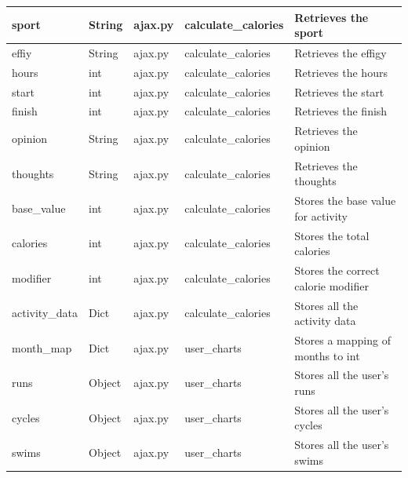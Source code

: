 \documentclass{article}[12pt,a4paper]
\begin{document}
\begin{table}[h]
\begin{tabular}{lllll}
sport             & String        & ajax.py             & calculate\_calories     & Retrieves the sport                     \\ \hline
effiy             & String        & ajax.py             & calculate\_calories     & Retrieves the effigy                    \\ \hline
hours             & int           & ajax.py             & calculate\_calories     & Retrieves the hours                     \\ \hline
start             & int           & ajax.py             & calculate\_calories     & Retrieves the start                     \\ \hline
finish            & int           & ajax.py             & calculate\_calories     & Retrieves the finish                    \\ \hline
opinion           & String        & ajax.py             & calculate\_calories     & Retrieves the opinion                   \\ \hline
thoughts          & String        & ajax.py             & calculate\_calories     & Retrieves the thoughts                  \\ \hline
base\_value       & int           & ajax.py             & calculate\_calories     & Stores the base value for activity      \\ \hline
calories          & int           & ajax.py             & calculate\_calories     & Stores the total calories               \\ \hline
modifier          & int           & ajax.py             & calculate\_calories     & Stores the correct calorie modifier     \\ \hline
activity\_data    & Dict          & ajax.py             & calculate\_calories     & Stores all the activity data            \\ \hline
month\_map        & Dict          & ajax.py             & user\_charts            & Stores a mapping of months to int       \\ \hline
runs              & Object        & ajax.py             & user\_charts            & Stores all the user's runs              \\ \hline
cycles            & Object        & ajax.py             & user\_charts            & Stores all the user's cycles            \\ \hline
swims             & Object        & ajax.py             & user\_charts            & Stores all the user's swims             \\ \hline

\end{tabular}
\end{table}
\end{document}
